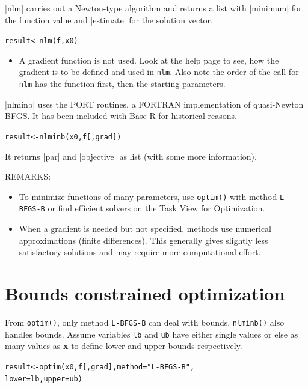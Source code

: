 \documentclass[9pt,a4paper,onecolumn,oneside]{extarticle}
\begin{document}
\begin{landscape}
\begin{multicols}{2}
\vfill
\columnbreak


|nlm| carries out a Newton-type algorithm and returns a list with |minimum| 
for the function value and |estimate| for the solution vector.

\begin{alltt}
 result <- nlm(f, x0)
\end{alltt}

\begin{itemize}
 \item
A gradient function is not used. Look at the help page to see, how the
gradient is to be defined and used in \verb|nlm|. Also note the order of
the call for \texttt{nlm} has the function first, then the starting parameters.
\end{itemize}

|nlminb| uses the PORT routines, a FORTRAN implementation of quasi-Newton BFGS.
It has been included with Base R for historical reasons.

\begin{alltt}
 result <- nlminb(x0, f [, grad])
\end{alltt}

It returns |par| and |objective| as list (with some more information).

REMARKS:

\begin{itemize}
\item
  To minimize functions of many parameters, use \texttt{optim()} with method 
  \texttt{L-BFGS-B} or find efficient solvers on the Task View for Optimization.
\item
  When a gradient is needed but not specified, methods use numerical
  approximations (finite differences). This generally gives slightly less
  satisfactory solutions and may require more computational effort.
\end{itemize}



\section*{\color{darkred} Bounds constrained optimization}

From \texttt{optim()}, only method \texttt{L-BFGS-B} can deal with
bounds. \texttt{nlminb()} also handles bounds. Assume variables
\texttt{lb} and \texttt{ub} have either single values or else as many 
values as \textbf{x} to define lower and upper bounds respectively.

\begin{alltt}
 result <- optim(x0, f [,grad], method = "L-BFGS-B",
                 lower = lb, upper = ub)
\end{alltt}


\end{multicols}
\end{landscape}
\end{document}
